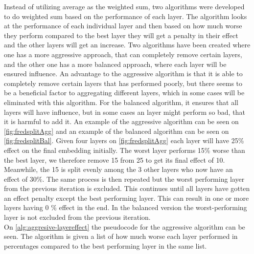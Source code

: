 Instead of utilizing average as the weighted sum, two algorithms were developed to do weighted sum based on the performance of each layer.
The algorithm looks at the performance of each individual layer and then based on how much worse they perform compared to the best layer they will get a penalty in their effect and the other layers will get an increase.
Two algorithms have been created where one has a more aggressive approach, that can completely remove certain layers, and the other one has a more balanced approach, where each layer will be ensured influence.
An advantage to the aggressive algorithm is that it is able to completely remove certain layers that has performed poorly, but there seems to be a beneficial factor to aggregating different layers, which in some cases will be eliminated with this algorithm.
For the balanced algorithm, it ensures that all layers will have influence, but in some cases an layer might perform so bad, that it is harmful to add it.
An example of the aggressive algorithm can be seen on \autoref{fig:fredsplitAgg} and an example of the balanced algorithm can be seen on \autoref{fig:fredsplitBal}.
Given four layers on \autoref{fig:fredsplitAgg} each layer will have 25\% effect on the final embedding initially.
The worst layer performs 15\% worse than the best layer, we therefore remove 15 from 25 to get its final effect of 10.
Meanwhile, the 15 is split evenly among the 3 other layers who now have an effect of 30\%.
The same process is then repeated but the worst performing layer from the previous iteration is excluded.
This continues until all layers have gotten an effect penalty except the best performing layer.
This can result in one or more layers having 0 \% effect in the end.
In the balanced version the worst-performing layer is not excluded from the previous iteration.
\\
On \autoref{alg:aggresive-layereffect} the pseudocode for the aggressive algorithm can be seen.
The algorithm is given a list of how much worse each layer performed in percentages compared to the best performing layer in the same list.
